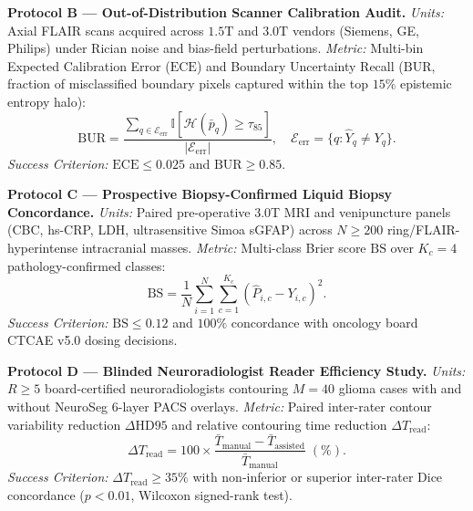 \documentclass[journal,onecolumn,10pt]{IEEEtran}
\begin{document}
\textbf{Protocol B --- Out-of-Distribution Scanner Calibration Audit.} \textit{Units:} Axial FLAIR scans acquired across $1.5\text{T}$ and $3.0\text{T}$ vendors (Siemens, GE, Philips) under Rician noise and bias-field perturbations. \textit{Metric:} Multi-bin Expected Calibration Error ($\text{ECE}$) and Boundary Uncertainty Recall ($\text{BUR}$, fraction of misclassified boundary pixels captured within the top $15\%$ epistemic entropy halo):
\begin{equation}
    \text{BUR} = \frac{\sum_{q \in \mathcal{E}_{\text{err}}} \mathbb{I}\!\left[\mathcal{H}(\bar{p}_q) \ge \tau_{85}\right]}{|\mathcal{E}_{\text{err}}|}, \quad \mathcal{E}_{\text{err}} = \{q : \hat{Y}_q \neq Y_q\}.
    \label{eq:prot_b}
\end{equation}
\textit{Success Criterion:} $\text{ECE} \le 0.025$ and $\text{BUR} \ge 0.85$.

\textbf{Protocol C --- Prospective Biopsy-Confirmed Liquid Biopsy Concordance.} \textit{Units:} Paired pre-operative 3.0T MRI and venipuncture panels (CBC, hs-CRP, LDH, ultrasensitive Simoa sGFAP) across $N \ge 200$ ring/FLAIR-hyperintense intracranial masses. \textit{Metric:} Multi-class Brier score $\text{BS}$ over $K_c = 4$ pathology-confirmed classes:
\begin{equation}
    \text{BS} = \frac{1}{N}\sum_{i=1}^{N}\sum_{c=1}^{K_c}\!\left(\hat{P}_{i,c} - Y_{i,c}\right)^2.
    \label{eq:prot_c}
\end{equation}
\textit{Success Criterion:} $\text{BS} \le 0.12$ and $100\%$ concordance with oncology board CTCAE v5.0 dosing decisions.

\textbf{Protocol D --- Blinded Neuroradiologist Reader Efficiency Study.} \textit{Units:} $R \ge 5$ board-certified neuroradiologists contouring $M = 40$ glioma cases with and without NeuroSeg 6-layer PACS overlays. \textit{Metric:} Paired inter-rater contour variability reduction $\Delta\text{HD95}$ and relative contouring time reduction $\Delta T_{\text{read}}$:
\begin{equation}
    \Delta T_{\text{read}} = 100 \times \frac{\bar{T}_{\text{manual}} - \bar{T}_{\text{assisted}}}{\bar{T}_{\text{manual}}}\;(\%).
    \label{eq:prot_d}
\end{equation}
\textit{Success Criterion:} $\Delta T_{\text{read}} \ge 35\%$ with non-inferior or superior inter-rater Dice concordance ($p < 0.01$, Wilcoxon signed-rank test).

\appendices
\end{document}
